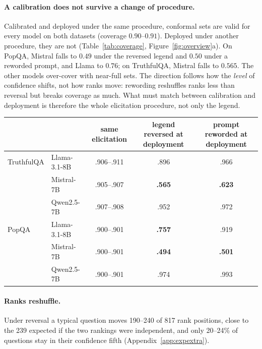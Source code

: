 \documentclass[11pt]{article}
\theoremstyle{definition}
\theoremstyle{remark}
\newcommand{\1}{\mathbf{1}}
\begin{document}
\paragraph{A calibration does not survive a change of procedure.} Calibrated and deployed under the
same procedure, conformal sets are valid for every model on both datasets (coverage $0.90$--$0.91$). Deployed
under another procedure, they are not (Table~\ref{tab:coverage}, Figure~\ref{fig:overview}a). On PopQA, Mistral
falls to $0.49$ under the reversed legend and $0.50$ under a reworded prompt, and Llama to $0.76$; on TruthfulQA,
Mistral falls to $0.565$. The other models over-cover with near-full sets. The direction follows how the
\emph{level} of confidence shifts, not how ranks move: rewording reshuffles ranks less than reversal but breaks
coverage as much. What must match between calibration and deployment is therefore the whole elicitation
procedure, not only the legend.
\begin{center}\small
\begin{tabular}{llccc}
\toprule
 & & same elicitation & legend reversed at deployment & prompt reworded at deployment\\
\midrule
TruthfulQA & Llama-3.1-8B & .906--.911 & .896 & .966\\
 & Mistral-7B   & .905--.907 & \textbf{.565} & \textbf{.623}\\
 & Qwen2.5-7B   & .907--.908 & .952 & .972\\
PopQA & Llama-3.1-8B & .900--.901 & \textbf{.757} & .919\\
 & Mistral-7B   & .900--.901 & \textbf{.494} & \textbf{.501}\\
 & Qwen2.5-7B   & .900--.901 & .974 & .993\\
\bottomrule
\end{tabular}
\label{tab:coverage}
\end{center}

\paragraph{Ranks reshuffle.}  Under reversal a typical question moves 190--240 of 817 rank positions, close to
the 239 expected if the two rankings were independent, and only 20--24\% of questions stay in their confidence
fifth (Appendix~\ref{app:expextra}).
\end{document}
